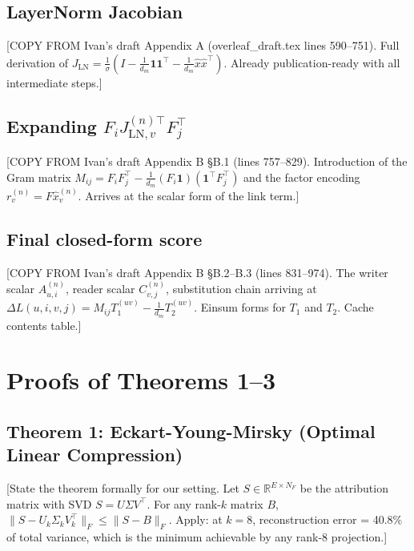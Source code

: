\documentclass[11pt]{article}
\begin{document}

\subsection{LayerNorm Jacobian}

[COPY FROM Ivan's draft Appendix A (overleaf\_draft.tex lines 590--751).
Full derivation of $J_{\text{LN}} = \frac{1}{\sigma}(I - \frac{1}{d_m}
\mathbf{1}\mathbf{1}^\top - \frac{1}{d_m}\hat{x}\hat{x}^\top)$.
Already publication-ready with all intermediate steps.]

\subsection{Expanding $F_i J_{\text{LN},v}^{(n)\top} F_j^\top$}

[COPY FROM Ivan's draft Appendix B \S B.1 (lines 757--829).
Introduction of the Gram matrix $M_{ij} = F_i F_j^\top -
\frac{1}{d_m}(F_i \mathbf{1})(\mathbf{1}^\top F_j^\top)$ and the
factor encoding $r_v^{(n)} = F \hat{x}_v^{(n)}$. Arrives at the
scalar form of the link term.]

\subsection{Final closed-form score}

[COPY FROM Ivan's draft Appendix B \S B.2--B.3 (lines 831--974).
The writer scalar $A_{u,i}^{(n)}$, reader scalar $C_{v,j}^{(n)}$,
substitution chain arriving at
$\Delta L(u,i,v,j) = M_{ij} T_1^{(uv)} - \frac{1}{d_m} T_2^{(uv)}$.
Einsum forms for $T_1$ and $T_2$. Cache contents table.]



\section{Proofs of Theorems 1--3}
\label{app:proofs}

\subsection{Theorem 1: Eckart-Young-Mirsky (Optimal Linear Compression)}

[State the theorem formally for our setting. Let $S \in \mathbb{R}^{E
\times N_F}$ be the attribution matrix with SVD $S = U \Sigma V^\top$.
For any rank-$k$ matrix $B$, $\|S - U_k \Sigma_k V_k^\top\|_F \leq
\|S - B\|_F$. Apply: at $k=8$, reconstruction error = 40.8\% of total
variance, which is the minimum achievable by any rank-8 projection.]
\end{document}
